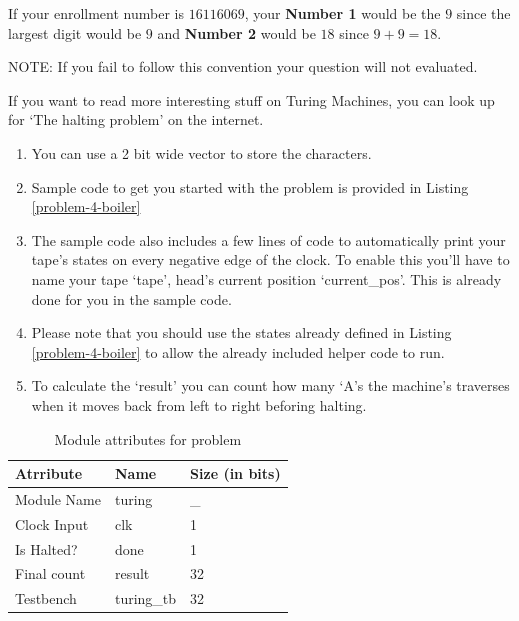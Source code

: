 \documentclass[a4paper,10pt]{article}
\theoremstyle{mytheor}
\newcommand{
  \insertverilog}[3]{
  
}
\newcounter{problemNumber}
\newcounter{hintCount} %
\newcommand{\hintcounter}[1]{%
  \refstepcounter{hintCount}%
  \thehintCount%
  \label{#1}}%
\newcounter{hintcnt}
\newcommand{\hint}[2] {
  \begin{tcolorbox}[arc=1pt,colback=blue!5!white,colframe=blue!75!black,title=\textbf{Hint - \hintcounter{#1}}]  
    #2
  \end{tcolorbox}
  \addtocounter{hintcnt}{1}
}
\begin{document}
{\begin{legal}
      If your enrollment number is $16116069$, your \textbf{Number 1}
      would be the $9$ since the largest digit would be $9$ and
      \textbf{Number 2} would be $18$ since
      $9+9=18$.

      {\color{red}NOTE:} If you fail to follow this convention your
      question will not evaluated.      
    \end{legal}
  If you want to read more interesting stuff on Turing Machines, you
  can look up for `The halting problem' on the internet.

  \hint{hint:problem-3}{ 
    \begin{enumerate}
    \item You can use a 2 bit wide vector to store the characters.
    \item Sample code to get you started with the problem is provided
      in Listing \ref{problem-4-boiler}
    \item The sample code also includes a few lines of code to
      automatically print your tape's states on every negative edge of
      the clock. To enable this you'll have to name your tape `tape',
      head's current position `current\_pos'. This is already done for 
      you in the sample code.
    \item Please note that you should use the states already defined
      in Listing \ref{problem-4-boiler} to allow the already included
      helper code to run.
    \item To calculate the `result' you can count how many `A's the 
      machine's traverses when it moves back from left to right
      beforing halting.
    \end{enumerate}
  }

  \begin{table}[!h]
    \centering
    \caption{Module attributes for problem \theproblemNumber}
    \label{table:problem-3-attr}
    \renewcommand{\arraystretch}{1.1} 
    \begin{tabularx}{0.8\textwidth}{|X|X|X|}
      \hline
      \rowcolor{greatblue}
      \color{white} Atrribute & \color{white}Name & \color{white}Size (in bits) \\
      \hline
      Module Name  & turing          & \_  \\
      Clock Input  & clk             &  1  \\
      Is Halted?   & done            &  1  \\
      Final count  & result          & 32  \\
      Testbench    & turing\_tb      & 32  \\
      \hline
    \end{tabularx}
  \end{table}
  
  \insertverilog{./verilog_files/problem4Boiler.v}{problem-4-boiler}{Code
    to get you started with problem 4.}
}
\end{document}
